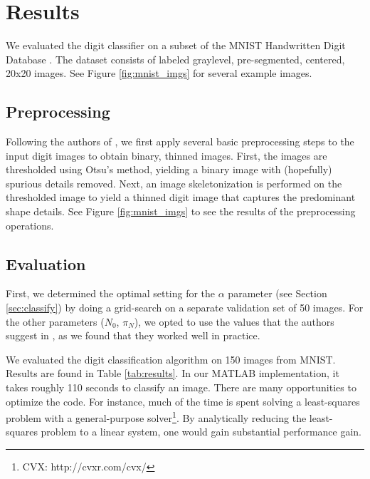 \documentclass[oribibl]{llncs}
\begin{document}
\section{Results}

We evaluated the digit classifier on a subset of the MNIST Handwritten Digit Database \cite{mnist}.
The dataset consists of labeled graylevel, pre-segmented, centered, 20x20 images.
See Figure \ref{fig:mnist_imgs} for several example images.

\subsection{Preprocessing}
\label{sec:preproc}

Following the authors of \cite{Hinton92adaptiveelastic}, we first apply several basic preprocessing steps to the input digit images to obtain binary, thinned images.
First, the images are thresholded using Otsu's method, yielding a binary image with (hopefully) spurious details removed.
Next, an image skeletonization is performed on the thresholded image to yield a thinned digit image that captures the predominant shape details.
See Figure \ref{fig:mnist_imgs} to see the results of the preprocessing operations.

\subsection{Evaluation}

First, we determined the optimal setting for the $\alpha$ parameter (see Section \ref{sec:classify}) by doing a grid-search on a separate validation set of 50 images.
For the other parameters ($N_0$, $\pi_N$), we opted to use the values that the authors suggest in \cite{Hinton92adaptiveelastic}, as we found that they worked well in practice.

We evaluated the digit classification algorithm on 150 images from MNIST.
Results are found in Table \ref{tab:results}.
In our MATLAB implementation, it takes roughly 110 seconds to classify an image.
There are many opportunities to optimize the code.
For instance, much of the time is spent solving a least-squares problem with a general-purpose solver\footnote{CVX: http://cvxr.com/cvx/}.
By analytically reducing the least-squares problem to a linear system, one would gain substantial performance gain.
\end{document}
